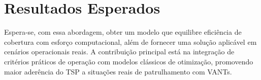 \documentclass[12 pt]{article}
\begin{document}
\section{Resultados Esperados}
Espera-se, com essa abordagem, obter um modelo que equilibre eficiência de cobertura com esforço computacional, além de fornecer uma solução aplicável em cenários operacionais reais. A contribuição principal está na integração de critérios práticos de operação com modelos clássicos de otimização, promovendo maior aderência do TSP a situações reais de patrulhamento com VANTs.




\end{document}
